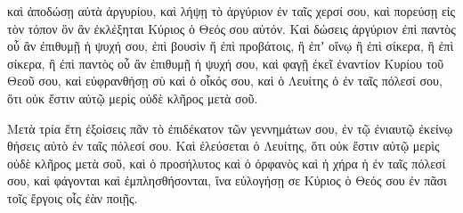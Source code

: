 {καὶ ἀποδώσῃ αὐτὰ ἀργυρίου, καὶ λήψῃ τὸ ἀργύριον ἐν ταῖς χερσί σου, καὶ πορεύσῃ εἰς τὸν τόπον ὃν ἂν ἐκλέξηται Κύριος ὁ Θεός σου αὐτόν.
Καὶ δώσεις ἀργύριον ἐπὶ παντὸς οὗ ἂν ἐπιθυμῇ ἡ ψυχή σου, ἐπὶ βουσὶν ἤ ἐπὶ προβάτοις, ἢ ἐπʼ οἴνῳ ἢ ἐπὶ σίκερα, ἢ ἐπὶ σίκερα, ἢ ἐπὶ παντὸς οὗ ἂν ἐπιθυμῇ ἡ ψυχή σου, καὶ φαγῇ ἐκεῖ ἐναντίον Κυρίου τοῦ Θεοῦ σου, καὶ εὐφρανθήσῃ σὺ καὶ ὁ οἶκός σου,
καὶ ὁ Λευίτης ὁ ἐν ταῖς πόλεσί σου, ὅτι οὐκ ἔστιν αὐτῷ μερὶς οὐδὲ κλῆρος μετὰ σοῦ.
\par }{\PP {}Μετὰ τρία ἔτη ἐξοίσεις πᾶν τὸ ἐπιδέκατον τῶν γεννημάτων σου, ἐν τῷ ἐνιαυτῷ ἐκείνῳ θήσεις αὐτὸ ἐν ταῖς πόλεσί σου.
Καὶ ἐλεύσεται ὁ Λευίτης, ὅτι οὐκ ἔστιν αὐτῷ μερὶς οὐδὲ κλῆρος μετὰ σοῦ, καὶ ὁ προσήλυτος καὶ ὁ ὀρφανὸς καὶ ἡ χήρα ἡ ἐν ταῖς πόλεσί σου, καὶ φάγονται καὶ ἐμπλησθήσονται, ἵνα εὐλογήσῃ σε Κύριος ὁ Θεός σου ἐν πᾶσι τοῖς ἔργοις οἷς ἐὰν ποιῇς.

}
